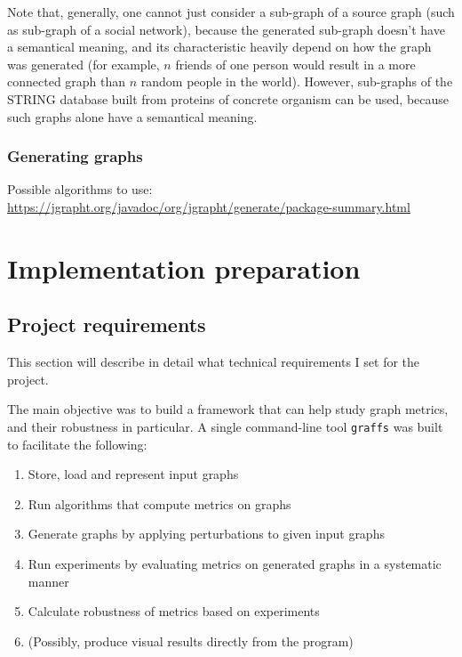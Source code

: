             Note that, generally, one cannot just consider a sub-graph of a source graph (such as sub-graph of a social network), because the generated sub-graph doesn't have a semantical meaning, and its characteristic heavily depend on how the graph was generated (for example, $n$ friends of one person would result in a more connected graph than $n$ random people in the world). However, sub-graphs of the STRING database built from proteins of concrete organism can be used, because such graphs alone have a semantical meaning.
        
        \subsubsection{Generating graphs}
        
            Possible algorithms to use: \url{https://jgrapht.org/javadoc/org/jgrapht/generate/package-summary.html}

    
\section{Implementation preparation}

    \subsection{Project requirements}
    
        This section will describe in detail what technical requirements I set for the project.
        
        The main objective was to build a framework that can help study graph metrics, and their robustness in particular. A single command-line tool \texttt{graffs} was built to facilitate the following:
        
        \begin{enumerate}
            \item Store, load and represent input graphs
            \item Run algorithms that compute metrics on graphs
            \item Generate graphs by applying perturbations to given input graphs
            \item Run experiments by evaluating metrics on generated graphs in a systematic manner
            \item Calculate robustness of metrics based on experiments
            \item (Possibly, produce visual results directly from the program)
        \end{enumerate}
        
